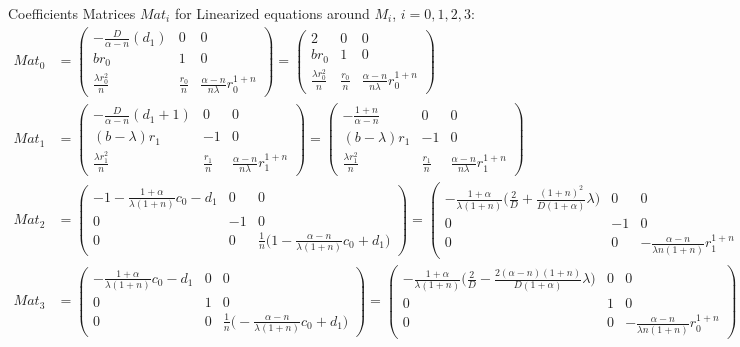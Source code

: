 \documentclass[a4paper,11pt]{article}
\begin{document}
Coefficients Matrices $Mat_i$ for Linearized equations around $M_i$, $i=0,1,2,3$: 
\begin{align*}
 Mat_0 &= \begin{pmatrix}
          -\frac{D}{\alpha-n}(d_1) & 0 & 0\\
          br_0 & 1 & 0\\
          \frac{\lambda r_0^2}{n} & \frac{r_0}{n} & \frac{\alpha-n}{n\lambda}r_0^{1+n}
         \end{pmatrix}
        = \begin{pmatrix}
          2 & 0 & 0\\
          br_0 & 1 & 0\\
          \frac{\lambda r_0^2}{n} & \frac{r_0}{n} & \frac{\alpha-n}{n\lambda}r_0^{1+n}
         \end{pmatrix}\\
 Mat_1 &= \begin{pmatrix}
          -\frac{D}{\alpha-n}(d_1+1) & 0 & 0\\
          (b-\lambda)r_1 & -1 & 0\\
          \frac{\lambda r_1^2}{n} & \frac{r_1}{n} & \frac{\alpha-n}{n\lambda}r_1^{1+n}
         \end{pmatrix}
        =\begin{pmatrix}
          -\frac{1+n}{\alpha-n} & 0 & 0\\
          (b-\lambda)r_1 & -1 & 0\\
          \frac{\lambda r_1^2}{n} & \frac{r_1}{n} & \frac{\alpha-n}{n\lambda}r_1^{1+n}
         \end{pmatrix}\\
 Mat_2 &= \begin{pmatrix}
	  -1-\frac{1+\alpha}{\lambda(1+n)} c_0 -d_1 & 0 & 0\\
	  0 & -1 & 0\\
	  0 & 0 & \frac{1}{n}\Big(1-\frac{\alpha-n}{\lambda(1+n)} c_0 +d_1\Big)
         \end{pmatrix}
        = \begin{pmatrix}
	  -\frac{1+\alpha}{\lambda(1+n)} \Big(\frac{2}{D} + \frac{(1+n)^2}{D(1+\alpha)}\lambda\Big) & 0 & 0\\
	  0 & -1 & 0\\
	  0 & 0 & -\frac{\alpha-n}{\lambda n(1+n)}r_1^{1+n}
         \end{pmatrix}\\
 Mat_3 &= \begin{pmatrix}
	  -\frac{1+\alpha}{\lambda(1+n)} c_0 -d_1 & 0 & 0\\
	  0 & 1 & 0\\
	  0 & 0 & \frac{1}{n}\Big(-\frac{\alpha-n}{\lambda(1+n)} c_0 +d_1\Big)
         \end{pmatrix}
	=\begin{pmatrix}
	  -\frac{1+\alpha}{\lambda(1+n)} \Big(\frac{2}{D} - \frac{2(\alpha-n)(1+n)}{D(1+\alpha)}\lambda\Big)& 0 & 0\\
	  0 & 1 & 0\\
	  0 & 0 & -\frac{\alpha-n}{\lambda n(1+n)}r_0^{1+n}
         \end{pmatrix}
\end{align*}
\end{document}
